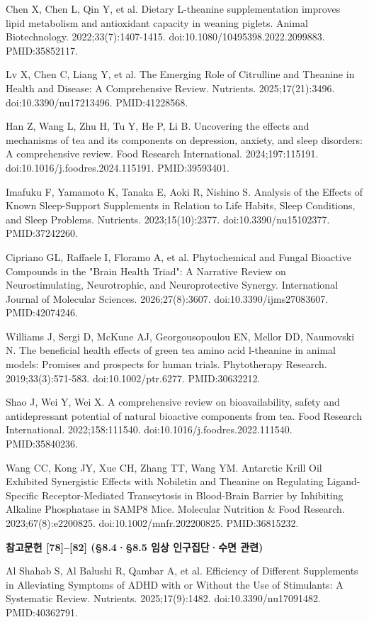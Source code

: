 \documentclass[11pt,oneside]{book}
\newcommand{\reff}[2]{\par\hangindent=7mm\hangafter=1\noindent[#1]\hspace{2mm}#2\par}
\begin{document}
\reff{70}{Chen X, Chen L, Qin Y, et al. Dietary L-theanine supplementation improves lipid metabolism and antioxidant capacity in weaning piglets. Animal Biotechnology. 2022;33(7):1407-1415. doi:10.1080/10495398.2022.2099883. PMID:35852117.}
\reff{71}{Lv X, Chen C, Liang Y, et al. The Emerging Role of Citrulline and Theanine in Health and Disease: A Comprehensive Review. Nutrients. 2025;17(21):3496. doi:10.3390/nu17213496. PMID:41228568.}
\reff{72}{Han Z, Wang L, Zhu H, Tu Y, He P, Li B. Uncovering the effects and mechanisms of tea and its components on depression, anxiety, and sleep disorders: A comprehensive review. Food Research International. 2024;197:115191. doi:10.1016/j.foodres.2024.115191. PMID:39593401.}
\reff{73}{Imafuku F, Yamamoto K, Tanaka E, Aoki R, Nishino S. Analysis of the Effects of Known Sleep-Support Supplements in Relation to Life Habits, Sleep Conditions, and Sleep Problems. Nutrients. 2023;15(10):2377. doi:10.3390/nu15102377. PMID:37242260.}
\reff{74}{Cipriano GL, Raffaele I, Floramo A, et al. Phytochemical and Fungal Bioactive Compounds in the "Brain Health Triad": A Narrative Review on Neurostimulating, Neurotrophic, and Neuroprotective Synergy. International Journal of Molecular Sciences. 2026;27(8):3607. doi:10.3390/ijms27083607. PMID:42074246.}
\reff{75}{Williams J, Sergi D, McKune AJ, Georgousopoulou EN, Mellor DD, Naumovski N. The beneficial health effects of green tea amino acid l-theanine in animal models: Promises and prospects for human trials. Phytotherapy Research. 2019;33(3):571-583. doi:10.1002/ptr.6277. PMID:30632212.}
\reff{76}{Shao J, Wei Y, Wei X. A comprehensive review on bioavailability, safety and antidepressant potential of natural bioactive components from tea. Food Research International. 2022;158:111540. doi:10.1016/j.foodres.2022.111540. PMID:35840236.}
\reff{77}{Wang CC, Kong JY, Xue CH, Zhang TT, Wang YM. Antarctic Krill Oil Exhibited Synergistic Effects with Nobiletin and Theanine on Regulating Ligand-Specific Receptor-Mediated Transcytosis in Blood-Brain Barrier by Inhibiting Alkaline Phosphatase in SAMP8 Mice. Molecular Nutrition \& Food Research. 2023;67(8):e2200825. doi:10.1002/mnfr.202200825. PMID:36815232.}
\par\smallskip\noindent\textbf{참고문헌 [78]–[82] (§8.4·§8.5 임상 인구집단·수면 관련)}\par\smallskip
\reff{78}{Al Shahab S, Al Balushi R, Qambar A, et al. Efficiency of Different Supplements in Alleviating Symptoms of ADHD with or Without the Use of Stimulants: A Systematic Review. Nutrients. 2025;17(9):1482. doi:10.3390/nu17091482. PMID:40362791.}
\end{document}
